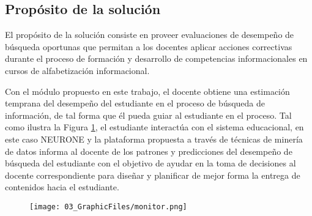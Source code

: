 \subsection{Propósito de la solución}
\label{subsec:proposito-solucion}
El propósito de la solución consiste en proveer evaluaciones de desempeño de búsqueda oportunas que permitan a los docentes aplicar acciones correctivas durante el proceso de formación y desarrollo de competencias informacionales en cursos de alfabetización informacional.

Con el módulo propuesto en este trabajo, el docente obtiene una estimación temprana del desempeño del estudiante en el proceso de búsqueda de información, de tal forma que él pueda guiar al estudiante en el proceso. Tal como ilustra la Figura \ref{fig:docente_estudiante}, el estudiante interactúa con el sistema educacional, en este caso NEURONE y la plataforma propuesta a través de técnicas de minería de datos informa al docente de los patrones y predicciones del desempeño de búsqueda del estudiante con el objetivo de ayudar en la toma de decisiones al docente correspondiente para diseñar y planificar de mejor forma la entrega de contenidos hacia el estudiante.

\begin{figure}[H]
	\centering
	\texttt{[image: 03\_GraphicFiles/monitor.png]}
	\label{fig:docente_estudiante}
\end{figure}
